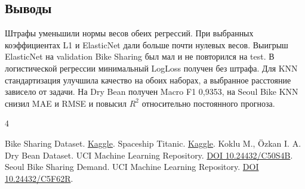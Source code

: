 \documentclass[a4paper,12pt]{article}
\begin{document}
\begin{samepage}
\section{Выводы}

Штрафы уменьшили нормы весов обеих регрессий. При выбранных коэффициентах L1 и ElasticNet дали больше почти нулевых весов. Выигрыш ElasticNet на validation Bike Sharing был мал и не повторился на test. В логистической регрессии минимальный LogLoss получен без штрафа. Для KNN стандартизация улучшила качество на обоих наборах, а выбранное расстояние зависело от задачи. На Dry Bean получен Macro F1 0,9353, на Seoul Bike KNN снизил MAE и RMSE и повысил $R^2$ относительно постоянного прогноза.

\end{samepage}
\begin{thebibliography}{4}\raggedright
{} Bike Sharing Dataset. \href{https://www.kaggle.com/datasets/marklvl/bike-sharing-dataset}{Kaggle}.
 Spaceship Titanic. \href{https://www.kaggle.com/competitions/spaceship-titanic/data}{Kaggle}.
 Koklu M., Özkan I. A. Dry Bean Dataset. UCI Machine Learning Repository. \href{https://doi.org/10.24432/C50S4B}{DOI 10.24432/C50S4B}.
 Seoul Bike Sharing Demand. UCI Machine Learning Repository. \href{https://doi.org/10.24432/C5F62R}{DOI 10.24432/C5F62R}.
\end{thebibliography}
\end{document}
